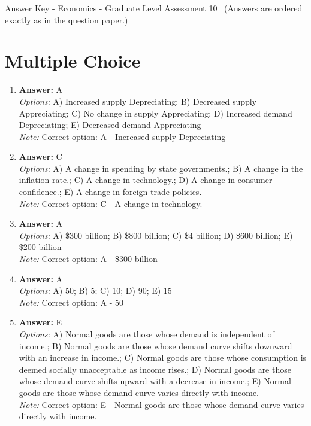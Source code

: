 \documentclass[12pt]{article}
\begin{document}
\begin{center}
Answer Key - Economics - Graduate Level Assessment 10 \
\small (Answers are ordered exactly as in the question paper.)
\end{center}

\section*{Multiple Choice}
\begin{enumerate}[label=\arabic*.]
\item \textbf{Answer:} A
\\ \textit{Options:} A) Increased supply Depreciating; B) Decreased supply Appreciating; C) No change in supply Appreciating; D) Increased demand Depreciating; E) Decreased demand Appreciating
\\ \textit{Note:} Correct option: A - Increased supply Depreciating
\item \textbf{Answer:} C
\\ \textit{Options:} A) A change in spending by state governments.; B) A change in the inflation rate.; C) A change in technology.; D) A change in consumer confidence.; E) A change in foreign trade policies.
\\ \textit{Note:} Correct option: C - A change in technology.
\item \textbf{Answer:} A
\\ \textit{Options:} A) \$300 billion; B) \$800 billion; C) \$4 billion; D) \$600 billion; E) \$200 billion
\\ \textit{Note:} Correct option: A - \$300 billion
\item \textbf{Answer:} A
\\ \textit{Options:} A) 50; B) 5; C) 10; D) 90; E) 15
\\ \textit{Note:} Correct option: A - 50
\item \textbf{Answer:} E
\\ \textit{Options:} A) Normal goods are those whose demand is independent of income.; B) Normal goods are those whose demand curve shifts downward with an increase in income.; C) Normal goods are those whose consumption is deemed socially unacceptable as income rises.; D) Normal goods are those whose demand curve shifts upward with a decrease in income.; E) Normal goods are those whose demand curve varies directly with income.
\\ \textit{Note:} Correct option: E - Normal goods are those whose demand curve varies directly with income.
\end{enumerate}
\end{document}

